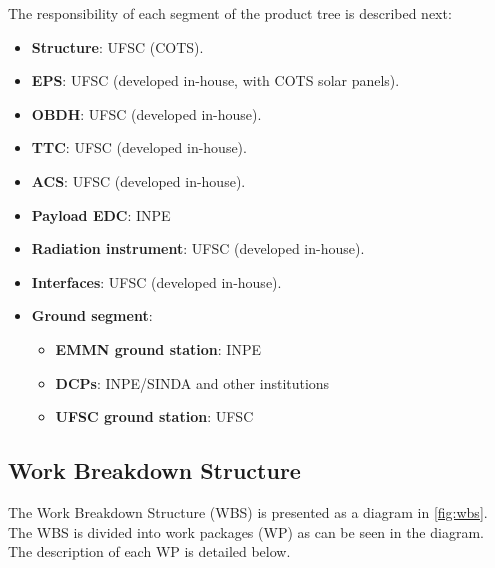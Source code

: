 The responsibility of each segment of the product tree is described next:

\begin{itemize}
    \item \textbf{Structure}: UFSC (COTS).
    \item \textbf{EPS}: UFSC (developed in-house, with COTS solar panels).
    \item \textbf{OBDH}: UFSC (developed in-house).
    \item \textbf{TTC}: UFSC (developed in-house).
    \item \textbf{ACS}: UFSC (developed in-house).
    \item \textbf{Payload EDC}: INPE
    \item \textbf{Radiation instrument}: UFSC (developed in-house).
    \item \textbf{Interfaces}: UFSC (developed in-house).
    \item \textbf{Ground segment}:
    \begin{itemize}
        \item \textbf{EMMN ground station}: INPE
        \item \textbf{DCPs}: INPE/SINDA and other institutions
        \item \textbf{UFSC ground station}: UFSC
    \end{itemize}
\end{itemize}

\subsection{Work Breakdown Structure}

The Work Breakdown Structure (WBS) is presented as a diagram in \autoref{fig:wbs}. The WBS is divided into work packages (WP) as can be seen in the diagram. The description of each WP is detailed below.

